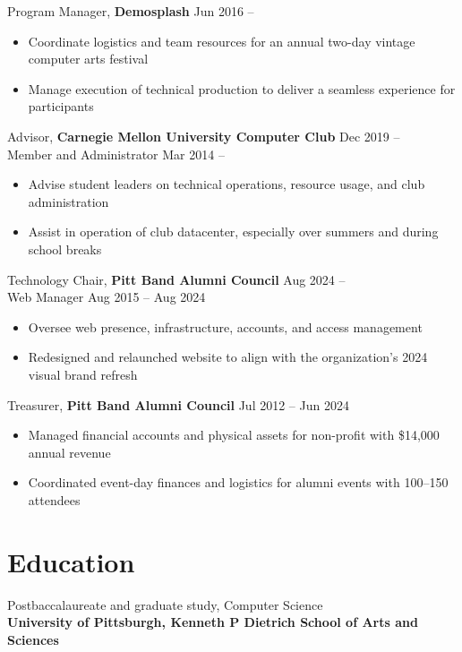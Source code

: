 \documentclass[11pt]{article}
\newcommand{\textdb}[1]{\fontseries{db}\selectfont#1\normalfont}
\newcommand{\present}{\phantom{Xxx 20XX}}
\begin{document}
\textdb{
Program Manager,
\textbf{Demosplash}
	\hfill Jun 2016 -- \present
}
\begin{itemize}
	\item Coordinate logistics and team resources for
		an annual two-day vintage computer arts festival
	\item Manage execution of technical production
		to deliver a seamless experience for participants
\end{itemize}

\textdb{
Advisor,
\textbf{Carnegie Mellon University Computer Club}
	\hfill Dec 2019 -- \present \\
}
\textdb{
Member and Administrator
	\hfill Mar 2014 -- \present
}
\begin{itemize}
	\item Advise student leaders on technical operations,
		resource usage, and club administration
	\item Assist in operation of club datacenter,
		especially over summers and during school breaks
\end{itemize}

\textdb{
Technology Chair,
\textbf{Pitt Band Alumni Council}
	\hfill Aug 2024 -- \present \\
}
\textdb{
Web Manager
	\hfill Aug 2015 -- Aug 2024
}
\begin{itemize}
	\item Oversee web presence, infrastructure,
		accounts, and access management
	\item Redesigned and relaunched website
		to align with the organization's 2024 visual brand refresh
\end{itemize}
\textdb{
Treasurer,
\textbf{Pitt Band Alumni Council}
	\hfill Jul 2012 -- Jun 2024
}
\begin{itemize}
	\item Managed financial accounts and physical assets
		for non-profit with \$14,000 annual revenue
	\item Coordinated event-day finances and logistics
		for alumni events with 100--150 attendees
\end{itemize}



\section{Education}

\textdb{
Postbaccalaureate and graduate study, Computer Science
	\\
}
\textbf{University of Pittsburgh, Kenneth P Dietrich School of Arts and Sciences}
\end{document}
